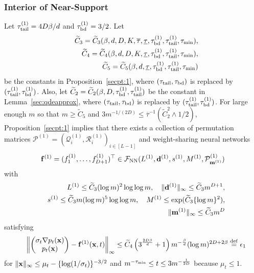\documentclass[twoside,11pt]{article}
\def\cF{\mathcal F}
\def\cP{\mathcal P}
\def\cQ{\mathcal Q}
\def\cR{\mathcal R}
\newcommand{\bd}{{\bf d}}
\newcommand{\bff}{{\bf f}}
\newcommand{\bfm}{{\bf m}}
\newcommand{\bx}{{\bf x}}
\newcommand{\bean}{\setlength\arraycolsep{1pt}\begin{eqnarray*}}
\newcommand{\eean}{\end{eqnarray*}}
\def\defeq{ \stackrel{\rm def}{=} }
\begin{document}
\subsubsection{Interior of Near-Support}
Let $\tau_{\rm tail}^{(1)} = 4D\beta / d $ and $\tau_{\rm bd}^{(1)} = 3/2$.
Let 
\bean
&& \widetilde C_{3} = \widetilde C_{3} ( \beta, d, D, K, \overline{\tau}, \underline{\tau}, \tau_{\rm bd}^{(1)}, \tau_{\rm tail}^{(1)}, \tau_{\rm min} ), 
\\
&& \widetilde C_{4} = \widetilde C_{4} ( \beta, d, D, K,  \underline{\tau}, \tau_{\rm bd}^{(1)}, \tau_{\rm tail}^{(1)}, \tau_{\rm min} ),
\\
&& \widetilde C_{5} = \widetilde C_{5} ( \beta, d, \underline{\tau}, \tau_{\rm bd}^{(1)}, \tau_{\rm tail}^{(1)}, \tau_{\min} )
\eean
be the constants in Proposition~\ref{secpt:1}, where $(\tau_{\rm tail}, \tau_{\rm bd})$ is replaced by $(\tau_{\rm tail}^{(1)}, \tau_{\rm bd}^{(1)} )$.
Also, let $\widetilde C_{2} = \widetilde C_{2}(\beta,D, \tau_{\rm bd}^{(1)}, \tau_{\rm tail}^{(1)})$ be the constant in Lemma~\ref{sec:qdeapprox}, where $( \tau_{\rm tail}, \tau_{\rm bd})$ is replaced by $(\tau_{\rm tail}^{(1)}, \tau_{\rm bd}^{(1)} )$.
For large enough $m$ so that $m \geq \widetilde C_{5}$ and $3m^{-1/(2D)} \leq \overline{\tau}^{-1} (\widetilde C_{2}^2 \wedge 1/2)$, Proposition~\ref{secpt:1} implies that
there exists a collection of permutation matrices $\cP^{(1)} = ( \cQ_{i}^{(1)}, \cR_{i}^{(1)} )_{i \in [L-1]} $ and weight-sharing neural networks 
\bean
\bff^{(1)} = (f_1^{(1)},\ldots,f_{D+1}^{(1)})^{\top} \in \cF_{\rm NN}( L^{(1)}, \bd^{(1)}, s^{(1)}, M^{(1)}, \cP^{(1)}_{\bfm^{(1)}} )
\eean
with 
\bean
&& L^{(1)} \leq \widetilde C_{3} (\log m )^{2} \log \log m, \quad \|\bd^{(1)}\|_{\infty} \leq  \widetilde C_{3} m^{D+1},
\\
&& s^{(1)} \leq  \widetilde C_{3} m (\log m)^{5} \log \log m, \quad M^{(1)} \leq \exp (  \widetilde C_{3} \{ \log m \}^{2} ), 
\\
&& \| \bfm^{(1)} \|_{\infty} \leq \widetilde C_{3} m^{D}
\eean
satisfying
\bean
&& \left\| \begin{pmatrix}
\sigma_t \nabla p_t(\bx) 
\\
 p_t(\bx)
\end{pmatrix}
-  \bff^{(1)}(\bx,t) \right\|_{\infty} \leq  \widetilde C_{4} \left( 3^{\frac{2D\beta}{d}} + 1 \right)  m^{-\frac{\beta}{d}} (\log m)^{2D + 2\beta} \defeq \epsilon_{1}
\eean
for $\|\bx\|_{\infty} \leq \mu_t- \{ \log (1/\sigma_t)\}^{-3/2}$ and $m^{-\tau_{\rm min}} \leq t \leq  3 m^{-\frac{1}{2D}}$ because $ \mu_{t} \leq 1$.
\end{document}
